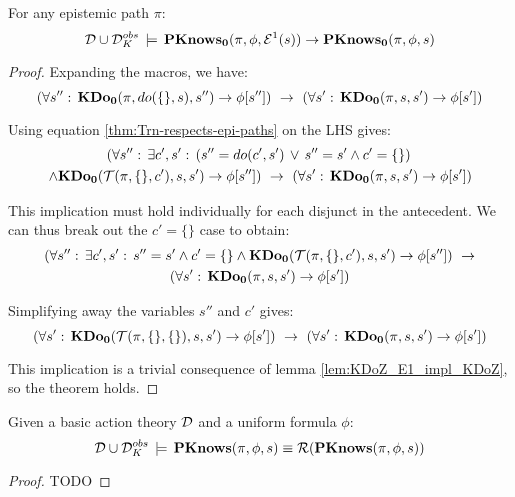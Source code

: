 \begin{thmext}
[{{[}{\ref{thm:En_impl_En-1}}]}] For any epistemic path $\pi$:
\[
\mathcal{D}\cup\mathcal{D}_{K}^{obs}\,\models\,\mathbf{PKnows_{0}}(\pi,\phi,\mathcal{E}^{1}(s))\rightarrow\mathbf{PKnows_{0}}(\pi,\phi,s)\]

\end{thmext}
\begin{proof}
Expanding the macros, we have:\[
\left(\forall s'':\,\mathbf{KDo_{0}}(\pi,do(\{\},s),s'')\rightarrow\phi[s'']\right)\,\,\rightarrow\,\,\left(\forall s':\,\mathbf{KDo_{0}}(\pi,s,s')\rightarrow\phi[s']\right)\]


Using equation \ref{thm:Trn-respects-epi-paths} on the LHS gives:\begin{multline*}
\left(\forall s'':\,\exists c',s':\,\left(s''=do(c',s')\,\vee\, s''=s'\wedge c'=\{\}\right)\right.\\
\left.\wedge\mathbf{KDo_{0}}(\mathcal{T}(\pi,\{\},c'),s,s')\rightarrow\phi[s'']\right)\,\,\rightarrow\,\,\left(\forall s':\,\mathbf{KDo_{0}}(\pi,s,s')\rightarrow\phi[s']\right)\end{multline*}


This implication must hold individually for each disjunct in the antecedent.
We can thus break out the $c'=\{\}$ case to obtain:\begin{multline*}
\left(\forall s'':\,\exists c',s':\, s''=s'\wedge c'=\{\}\wedge\mathbf{KDo_{0}}(\mathcal{T}(\pi,\{\},c'),s,s')\rightarrow\phi[s'']\right)\,\,\rightarrow\\
\left(\forall s':\,\mathbf{KDo_{0}}(\pi,s,s')\rightarrow\phi[s']\right)\end{multline*}


Simplifying away the variables $s''$ and $c'$ gives:\[
\left(\forall s':\,\mathbf{KDo_{0}}(\mathcal{T}(\pi,\{\},\{\}),s,s')\rightarrow\phi[s']\right)\,\,\rightarrow\,\,\left(\forall s':\,\mathbf{KDo_{0}}(\pi,s,s')\rightarrow\phi[s']\right)\]


This implication is a trivial consequence of lemma \ref{lem:KDoZ_E1_impl_KDoZ},
so the theorem holds. 
\end{proof}
\medskip{}


\begin{thmext}
[{{[}{\ref{thm:Reg_PKnows}}]}] Given a basic action theory $\mathcal{D}$ and a uniform
formula $\phi$:\[
\mathcal{D}\cup\mathcal{D}_{K}^{obs}\,\models\,\mathbf{PKnows}(\pi,\phi,s)\equiv\mathcal{R}(\mathbf{PKnows}(\pi,\phi,s))\]

\end{thmext}
\begin{proof}
TODO
\end{proof}

